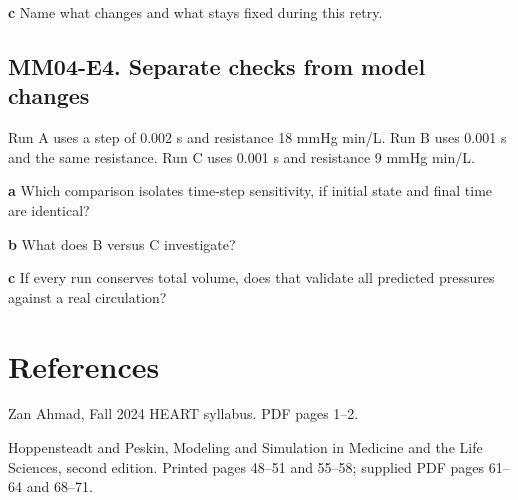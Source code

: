 \documentclass[11pt,letterpaper]{article}
\theoremstyle{definition}\newtheorem{definition}{Definition}\newtheorem{example}{Example}
\numberwithin{equation}{section}
\begin{document}
\textbf{c} Name what changes and what stays fixed during this retry.

\par\noindent\begin{minipage}{\linewidth}
\subsection*{MM04-E4. Separate checks from model changes}
Run A uses a step of 0.002 s and resistance 18 mmHg min/L. Run B uses 0.001 s and the same resistance. Run C uses 0.001 s and resistance 9 mmHg min/L.

\textbf{a} Which comparison isolates time-step sensitivity, if initial state and final time are identical?

\end{minipage}\par\medskip
\textbf{b} What does B versus C investigate?

\textbf{c} If every run conserves total volume, does that validate all predicted pressures against a real circulation?

\section*{References}
\noindent\begin{minipage}{\linewidth}
Zan Ahmad, Fall 2024 HEART syllabus. PDF pages 1--2.

\end{minipage}\par\medskip
\noindent\begin{minipage}{\linewidth}
Hoppensteadt and Peskin, Modeling and Simulation in Medicine and the Life Sciences, second edition. Printed pages 48--51 and 55--58; supplied PDF pages 61--64 and 68--71.

\end{minipage}\par\medskip
\end{document}
